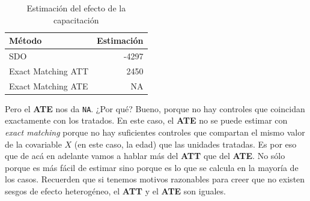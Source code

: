 \documentclass[
  letterpaper,
  DIV=11,
  numbers=noendperiod,
  oneside]{scrreprt}
\newenvironment{Shaded}{\begin{snugshade}}{\end{snugshade}}
\newcommand{\AttributeTok}[1]{\textcolor[rgb]{0.40,0.45,0.13}{#1}}
\newcommand{\DecValTok}[1]{\textcolor[rgb]{0.68,0.00,0.00}{#1}}
\newcommand{\FunctionTok}[1]{\textcolor[rgb]{0.28,0.35,0.67}{#1}}
\newcommand{\NormalTok}[1]{\textcolor[rgb]{0.00,0.23,0.31}{#1}}
\newcommand{\OtherTok}[1]{\textcolor[rgb]{0.00,0.23,0.31}{#1}}
\newcommand{\SpecialCharTok}[1]{\textcolor[rgb]{0.37,0.37,0.37}{#1}}
\newcommand{\StringTok}[1]{\textcolor[rgb]{0.13,0.47,0.30}{#1}}
\begin{document}
\begin{Shaded}
\end{Shaded}

\begin{table}
\caption*{
{\large Estimación del efecto de la capacitación}
} 
\fontsize{12.0pt}{14.4pt}\selectfont
\begin{tabular*}{\linewidth}{@{\extracolsep{\fill}}lr}
\toprule
Método & Estimación \\ 
\midrule\addlinespace[2.5pt]
SDO & -4297 \\ 
Exact Matching ATT & 2450 \\ 
Exact Matching ATE & NA \\ 
\bottomrule
\end{tabular*}
\end{table}

Pero el \textbf{ATE} nos da \texttt{NA}. ¿Por qué? Bueno, porque no hay
controles que coincidan exactamente con los tratados. En este caso, el
\textbf{ATE} no se puede estimar con \emph{exact matching} porque no hay
suficientes controles que compartan el mismo valor de la covariable
\(X\) (en este caso, la edad) que las unidades tratadas. Es por eso que
de acá en adelante vamos a hablar más del \textbf{ATT} que del
\textbf{ATE}. No sólo porque es más fácil de estimar sino porque es lo
que se calcula en la mayoría de los casos. Recuerden que si tenemos
motivos razonables para creer que no existen sesgos de efecto
heterogéneo, el \textbf{ATT} y el \textbf{ATE} son iguales.
\end{document}
